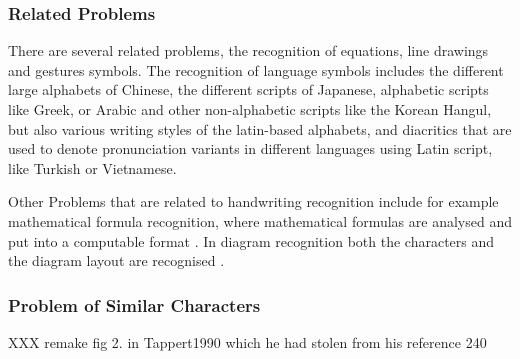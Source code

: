 \subsubsection{Related Problems}
\label{sec:relatedproblems}

There are several related problems, the recognition of equations, line 
drawings and gestures symbols. The recognition of language symbols includes 
the different large alphabets of Chinese, the different scripts of Japanese, 
alphabetic scripts like Greek, or Arabic and other non-alphabetic scripts like
the Korean  Hangul, but also various writing styles of the latin-based 
alphabets, and diacritics that are used to denote pronunciation variants in 
different languages using Latin script, like Turkish or Vietnamese.

Other Problems that are related to handwriting recognition include for example
mathematical formula recognition, where mathematical formulas are analysed and 
put into a computable format . In diagram recognition 
both the characters and the diagram layout are 
recognised .

\subsubsection{Problem of Similar Characters}
\label{sec:similarcharacters}

XXX remake fig 2. in Tappert1990 which he had stolen from his reference 240


